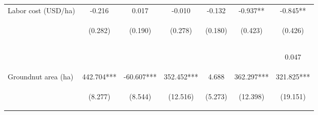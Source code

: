 \begin{center}
\begin{tabular}{lcccccc}
Labor cost (USD/ha) & -0.216 & 0.017 & -0.010 & -0.132 & -0.937** & -0.845** \\
 & \begin{footnotesize}(0.282)\end{footnotesize} & \begin{footnotesize}(0.190)\end{footnotesize} & \begin{footnotesize}(0.278)\end{footnotesize} & \begin{footnotesize}(0.180)\end{footnotesize} & \begin{footnotesize}(0.423)\end{footnotesize} & \begin{footnotesize}(0.426)\end{footnotesize} \\
\vspace{4pt} & \begin{footnotesize}[0.444]\end{footnotesize} & \begin{footnotesize}[0.929]\end{footnotesize} & \begin{footnotesize}[0.970]\end{footnotesize} & \begin{footnotesize}[0.464]\end{footnotesize} & \begin{footnotesize}[0.027]\end{footnotesize} & \begin{footnotesize}0.047\end{footnotesize} \\
Groundnut area (ha) & 442.704*** & -60.607*** & 352.452*** & 4.688 & 362.297*** & 321.825*** \\
 & \begin{footnotesize}(8.277)\end{footnotesize} & \begin{footnotesize}(8.544)\end{footnotesize} & \begin{footnotesize}(12.516)\end{footnotesize} & \begin{footnotesize}(5.273)\end{footnotesize} & \begin{footnotesize}(12.398)\end{footnotesize} & \begin{footnotesize}(19.151)\end{footnotesize} \\

\end{tabular}
\end{center}
